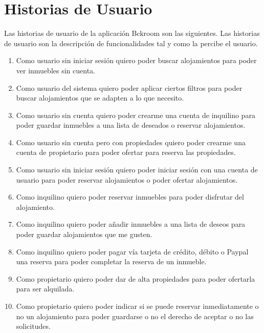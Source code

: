 \section{Historias de Usuario}

Las historias de usuario de la aplicación Bckroom son las siguientes. Las historias de usuario son la descripción de funcionalidades tal y como la percibe el usuario.

\begin{enumerate}[label=HU\arabic*:]
    \item Como usuario sin iniciar sesión quiero poder buscar alojamientos para poder ver inmuebles sin cuenta.

    \item Como usuario del sistema quiero poder aplicar ciertos filtros para poder buscar alojamientos que se adapten a lo que necesito.

    \item Como usuario sin cuenta quiero poder crearme una cuenta de inquilino para poder guardar inmuebles a una lista de deseados o reservar alojamientos.

    \item Como usuario sin cuenta pero con propiedades quiero poder crearme una cuenta de propietario para poder ofertar para reserva las propiedades.

    \item Como usuario sin iniciar sesión quiero poder iniciar sesión con una cuenta de usuario para poder reservar alojamientos o poder ofertar alojamientos.

    \item Como inquilino quiero poder reservar inmuebles para poder disfrutar del alojamiento.

    \item Como inquilino quiero poder añadir inmuebles a una lista de deseos para poder guardar alojamientos que me gusten.

    \item Como inquilino quiero poder pagar vía tarjeta de crédito, débito o Paypal una reserva para poder completar la reserva de un inmueble.

    \item Como propietario quiero poder dar de alta propiedades para poder ofertarla para ser alquilada.

    \item Como propietario quiero poder indicar si se puede reservar inmediatamente o no un alojamiento para poder guardarse o no el derecho de aceptar o no las solicitudes.
\end{enumerate}